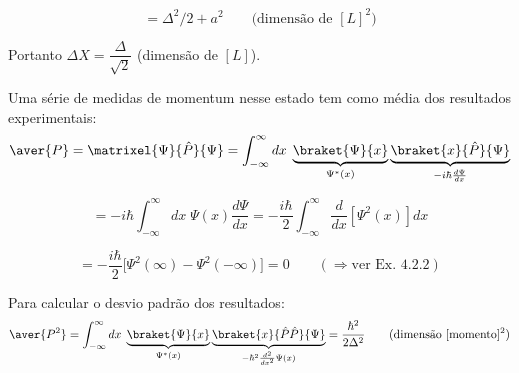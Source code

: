 \begin{equation}
    = \Delta^2/2 + a^2 \qquad \text{(dimensão de } [L]^2 \text{)}
\label{eq:aula12_X2_medio_resultado}
\end{equation}


Portanto $\boxed{\Delta X = \dfrac{\Delta}{\sqrt{2}}}$ (dimensão de $[L]$).

Uma série de medidas de momentum nesse estado tem como média dos resultados experimentais:
\begin{equation}
    \aver{P} = \matrixel{\Psi}{\hat{P}}{\Psi} = \int_{-\infty}^{\infty} dx\; \underbrace{\braket{\Psi}{x}}_{\Psi^*(x)}\underbrace{\braket{x}{\hat{P}}{\Psi}}_{-i\hbar \frac{d\Psi}{dx}}
\label{eq:aula12_P_medio_def}
\end{equation}

\begin{equation}
    = -i\hbar \int_{-\infty}^{\infty} dx\; \Psi(x)\frac{d\Psi}{dx} = -\frac{i\hbar}{2}\int_{-\infty}^{\infty} \frac{d}{dx}\left[\Psi^2(x)\right] dx
\label{eq:aula12_P_medio_integral}
\end{equation}

\begin{equation}
    = -\frac{i\hbar}{2}\Big[\Psi^2(\infty) - \Psi^2(-\infty)\Big] = 0 \qquad (\Rightarrow \text{ver Ex. 4.2.2})
\label{eq:aula12_P_medio_resultado}
\end{equation}

Para calcular o desvio padrão dos resultados:
\begin{equation}
    \aver{P^2} = \int_{-\infty}^{\infty} dx\; \underbrace{\braket{\Psi}{x}}_{\Psi^*(x)}\underbrace{\braket{x}{\hat{P}\hat{P}}{\Psi}}_{-\hbar^2 \frac{d^2}{dx^2}\Psi(x)} = \frac{\hbar^2}{2\Delta^2} \qquad \text{(dimensão } [\text{momento}]^2 \text{)}
\label{eq:aula12_P2_medio}
\end{equation}

